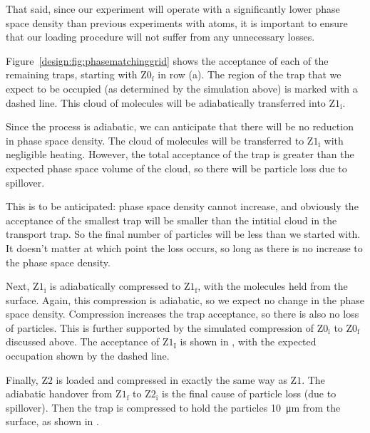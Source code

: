 That said, since our experiment will operate with a significantly lower phase
space density than previous experiments with atoms, it is important to ensure
that our loading procedure will not suffer from any unnecessary losses.

Figure~\ref{design:fig:phasematchinggrid} shows the acceptance of each of the
remaining traps, starting with $\mathrm{Z0_f}$ in row (a). The region of the
trap that we expect to be occupied (as determined by the simulation above) is
marked with a dashed line. This cloud of molecules will be adiabatically
transferred into $\mathrm{Z1_i}$.

Since the process is adiabatic, we can anticipate that there will be no
reduction in phase space density. The cloud of molecules will be transferred to
$\mathrm{Z1_i}$ with negligible heating. However, the total acceptance of the
trap is greater than the expected phase space volume of the cloud, so there
will be particle loss due to spillover.

This is to be anticipated: phase space density cannot increase, and obviously
the acceptance of the smallest trap will be smaller than the intitial cloud in
the transport trap. So the final number of particles will be less 
than we started with. It doesn't matter at which point the loss occurs, so long
as there is no increase to the phase space density.

Next, $\mathrm{Z1_i}$ is adiabatically compressed to $\mathrm{Z1_f}$, with the
molecules held  from the surface. Again, this
compression is adiabatic, so we expect no change in the phase space density.
Compression increases the trap acceptance, so there is also no loss of
particles. This is further supported by the simulated compression of
$\mathrm{Z0_i}$ to $\mathrm{Z0_f}$ discussed above. The acceptance of
$\mathrm{Z1_I}$ is shown in , with
the expected occupation shown by the dashed line.

Finally, $\mathrm{Z2}$ is loaded and compressed in exactly the same way as
$\mathrm{Z1}$. The adiabatic handover from $\mathrm{Z1_f}$ to $\mathrm{Z2_i}$
is the final cause of particle loss (due to spillover). Then the trap is
compressed to hold the particles \SI{10}{\micro\meter} from the surface, as
shown in .



